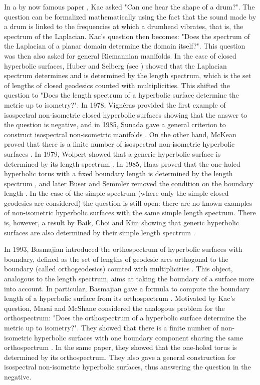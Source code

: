\documentclass[a4paper,12pt]{article}
\theoremstyle{definition}
\theoremstyle{remark}
\begin{document}
In a by now famous paper \cite{kac}, Kac asked "Can one hear the shape of a drum?". The question can be formalized mathematically using the fact that the sound made by a drum is linked to the frequencies at which a drumhead vibrates, that is, the spectrum of the Laplacian. Kac's question then becomes: "Does the spectrum of the Laplacian of a planar domain determine the domain itself?". This question was then also asked for general Riemannian manifolds. In the case of closed hyperbolic surfaces, Huber and Selberg (see \cite[Chapter~7.1]{buser}) showed that the Laplacian spectrum determines and is determined by the length spectrum, which is the set of lengths of closed geodesics counted with multiplicities. This shifted the question to "Does the length spectrum of a hyperbolic surface determine the metric up to isometry?". 
In 1978, Vignéras provided the first example of isospectral non-isometric closed hyperbolic surfaces \cite{vigneras} showing that the answer to the question is negative, and in 1985, Sunada gave a general criterion to construct isospectral non-isometric manifolds \cite{sunada}. On the other hand, McKean proved that there is a finite number of isospectral non-isometric hyperbolic surfaces \cite{McKean}. In 1979, Wolpert showed that a generic hyperbolic surface is determined by its length spectrum \cite{Wolpert}. In 1985, Haas proved that the one-holed hyperbolic torus with a fixed boundary length is determined by the length spectrum \cite{Haas}, and later Buser and Semmler removed the condition on the boundary length \cite{BuSem}.
In the case of the simple spectrum (where only the simple closed geodesics are considered) the question is still open: there are no known examples of non-isometric hyperbolic surfaces with the same simple length spectrum. There is, however, a result by Baik, Choi and Kim showing that generic hyperbolic surfaces are also determined by their simple length spectrum \cite{BaikChoiKim}. 

In 1993, Basmajian introduced the orthospectrum of hyperbolic surfaces with boundary, defined as the set of lengths of geodesic arcs orthogonal to the boundary (called orthogeodesics) counted with multiplicities \cite{Basmajian}. This object, analogous to the length spectrum, aims at taking the boundary of a surface more into account. In particular, Basmajian gave a formula to compute the boundary length of a hyperbolic surface from its orthospectrum \cite{Basmajian}. Motivated by Kac's question, Masai and McShane considered the analogous problem for the orthospectrum: "Does the orthospectrum of a hyperbolic surface determine the metric up to isometry?". They showed that there is a finite number of non-isometric hyperbolic surfaces with one boundary component sharing the same orthospectrum \cite{orthoSys}. In the same paper, they showed that the one-holed torus is determined by its orthospectrum. They also gave a general construction for isospectral non-isometric hyperbolic surfaces, thus answering the question in the negative.\\
\end{document}
